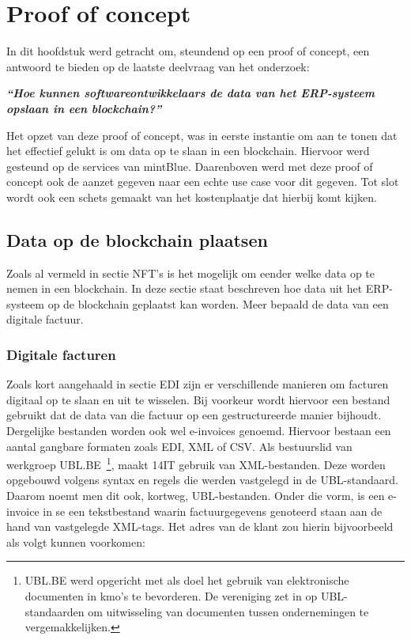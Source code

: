 \chapter{Proof of concept}
\label{ch:proof-of-concept}



In dit hoofdstuk werd getracht om, steundend op een proof of concept, een antwoord te bieden op de laatste deelvraag van het onderzoek:

\begin{center}
	\textit{\textbf{``Hoe kunnen softwareontwikkelaars de data van het ERP-systeem opslaan in een blockchain?''}}
\end{center}

Het opzet van deze proof of concept, was in eerste instantie om aan te tonen dat het effectief gelukt is om data op te slaan in een blockchain. Hiervoor werd gesteund op de services van mintBlue. Daarenboven werd met deze proof of concept ook de aanzet gegeven naar een echte use case voor dit gegeven. Tot slot wordt ook een schets gemaakt van het kostenplaatje dat hierbij komt kijken.


\section{Data op de blockchain plaatsen}
\label{sec:nft-invoicing}

Zoals al vermeld in sectie NFT's is het mogelijk om eender welke data op te nemen in een blockchain. In deze sectie staat beschreven hoe data uit het ERP-systeem op de blockchain geplaatst kan worden. Meer bepaald de data van een digitale factuur.

\subsection{Digitale facturen}
\label{sub:digitale-facturen}

Zoals kort aangehaald in sectie EDI zijn er verschillende manieren om facturen digitaal op te slaan en uit te wisselen.
Bij voorkeur wordt hiervoor een bestand gebruikt dat de data van die factuur op een gestructureerde manier bijhoudt. Dergelijke bestanden worden ook wel e-invoices genoemd. Hiervoor bestaan een aantal gangbare formaten zoals EDI, XML of CSV. Als bestuurslid van werkgroep UBL.BE~\footnote{UBL.BE werd opgericht met als doel het gebruik van elektronische documenten in kmo's te bevorderen. De vereniging zet in op UBL-standaarden om uitwisseling van documenten tussen ondernemingen te vergemakkelijken.}, maakt 14IT gebruik van XML-bestanden. Deze worden opgebouwd volgens syntax en regels die werden vastgelegd in de UBL-standaard. Daarom noemt men dit ook, kortweg, UBL-bestanden. Onder die vorm, is een e-invoice in se een tekstbestand waarin factuurgegevens genoteerd staan aan de hand van vastgelegde XML-tags. Het adres van de klant zou hierin bijvoorbeeld als volgt kunnen voorkomen:


